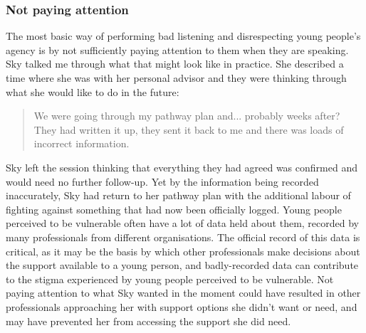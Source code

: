 \subsubsection{Not paying attention}
The most basic way of performing bad listening and disrespecting young people's agency is by not sufficiently paying attention to them when they are speaking. Sky talked me through what that might look like in practice. She described a time where she was with her personal advisor and they were thinking through what she would like to do in the future:
\begin{quote}
We were going through my pathway plan and... probably weeks after? They had written it up, they sent it back to me and there was loads of incorrect information.
\end{quote}
Sky left the session thinking that everything they had agreed was confirmed and would need no further follow-up. Yet by the information being recorded inaccurately, Sky had return to her pathway plan with the additional labour of fighting against something that had now been officially logged. Young people perceived to be vulnerable often have a lot of data held about them, recorded by many professionals from different organisations. The official record of this data is critical, as it may be the basis by which other professionals make decisions about the support available to a young person, and badly-recorded data can contribute to the stigma experienced by young people perceived to be vulnerable. Not paying attention to what Sky wanted in the moment could have resulted in other professionals approaching her with support options she didn't want or need, and may have prevented her from accessing the support she did need.

